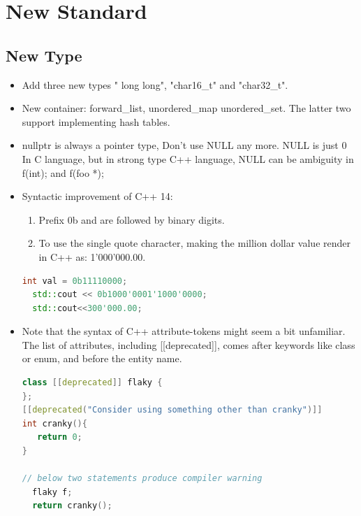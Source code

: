 \documentclass[a4paper,12pt,twoside]{book}
\begin{document}
\section{New Standard}

\subsection{New Type}

\begin{itemize}
\item Add three new types " long long", "char16\_t"  and "char32\_t".

\item New container: forward\_list, unordered\_map unordered\_set.  The latter two support implementing hash tables.

\item nullptr is always a pointer type, Don't use NULL any more. NULL is just 0 In C language, but in strong type C++ language, NULL can be ambiguity in f(int); and f(foo *);

\item Syntactic improvement of C++ 14:
\begin{enumerate}
\item Prefix 0b and are followed by binary digits.
\item To use the single quote character, making the million dollar value render in C++ as: 1'000'000.00.
\end{enumerate}
\begin{lstlisting}[frame=single, language=c++]
  int val = 0b11110000;
  std::cout << 0b1000'0001'1000'0000;
  std::cout<<300'000.00;
\end{lstlisting}

\item Note that the syntax of C++ attribute-tokens might seem a bit unfamiliar. The list of attributes, including [[deprecated]], comes after keywords like class or enum, and before the entity name.

\begin{lstlisting}[frame=single, language=c++]
class [[deprecated]] flaky {
};
[[deprecated("Consider using something other than cranky")]]
int cranky(){
   return 0;
}

// below two statements produce compiler warning
  flaky f;
  return cranky();
\end{lstlisting}

\end{itemize}
\end{document}
